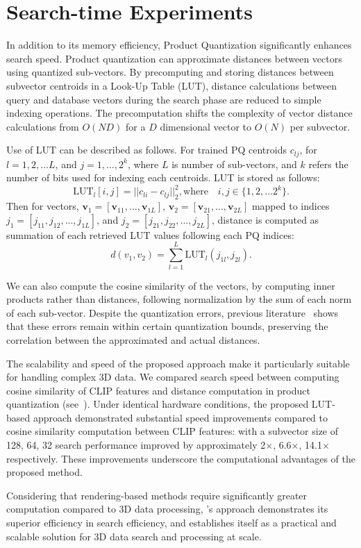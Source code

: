 \section{Search-time Experiments}
\label{pq}

In addition to its memory efficiency, Product Quantization significantly enhances search speed. Product quantization can approximate distances between vectors using quantized sub-vectors. By precomputing and storing distances between subvector centroids in a Look-Up Table (LUT), distance calculations between query and database vectors during the search phase are reduced to simple indexing operations. The precomputation shifts the complexity of vector distance calculations from $O(ND)$ for a $D$ dimensional vector to $O(N)$ per subvector.

Use of LUT can be described as follows. For trained PQ centroids $c_{lj}$, for $l = 1, 2, \dots L$, and $j= 1, ..., 2^k$, where $L$ is number of sub-vectors, and $k$ refers the number of bits used for indexing each centroids. LUT is stored as follows:
\begin{equation}
    \textrm{LUT}_{l}[i, j] = ||c_{li}-c_{lj}||_2^2, \textrm{where}\quad i, j \in \{1, 2, ... 2^k\}. 
\end{equation}
Then for vectors, $\mathbf{v}_1 = [\mathbf{v}_{11}, \ldots, \mathbf{v}_{1L}]$, $\mathbf{v}_2 = [\mathbf{v}_{21}, \ldots, \mathbf{v}_{2L}]$ mapped to indices $j_1=[j_{11}, j_{12}, ...,j_{1L}]$, and $j_2=[j_{21}, j_{22}, ...,j_{2L}]$, distance is computed as summation of each retrieved LUT values following each PQ indices:
\begin{equation}
    d(v_1, v_2) = \sum_{l=1}^L{\textrm{LUT}_l(j_{1l}, j_{2l})}.
\end{equation}

We can also compute the cosine similarity of the vectors, by computing inner products rather than distances, following normalization by the sum of each norm of each sub-vector. Despite the quantization errors, previous literature~\cite{product_quantization} shows that these errors remain within certain quantization bounds, preserving the correlation between the approximated and actual distances. 

The scalability and speed of the proposed approach make it particularly suitable for handling complex 3D data.
We compared search speed between computing cosine similarity of CLIP features and distance computation in product quantization (see~). Under identical hardware conditions, the proposed LUT-based approach demonstrated substantial speed improvements compared to cosine similarity computation between CLIP features: with a subvector size of 128, 64, 32  search performance improved by approximately 2$\times$, 6.6$\times$, 14.1$\times$ respectively.
These improvements underscore the computational advantages of the proposed method.

Considering that rendering-based methods require significantly greater computation compared to 3D data processing, \nickname's approach demonstrates its superior efficiency in search efficiency, and establishes itself as a practical and scalable solution for 3D data search and processing at scale.


